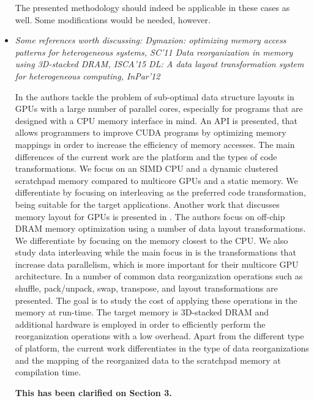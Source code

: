\documentclass[12pt,a4paper,notitlepage]{article}
\begin{document}
\begin{itemize}
The presented methodology should indeed be applicable in these cases as well. Some modifications would be needed, however.

\item \textit{Some references worth discussing:
Dymaxion: optimizing memory access patterns for heterogeneous systems, SC'11
Data reorganization in memory using 3D-stacked DRAM, ISCA'15
DL: A data layout transformation system for heterogeneous computing, InPar'12}

In \cite{dymaxion} the authors tackle the problem of sub-optimal data structure layouts in GPUs with a large number of parallel cores, especially for programs that are designed with a CPU memory interface in mind. 
An API is presented, that allows programmers to improve CUDA programs by optimizing memory mappings in order to increase the efficiency of memory accesses. 
The main differences of the current work are the platform and the types of code transformations. 
We focus on an SIMD CPU and a dynamic clustered scratchpad memory compared to multicore GPUs and a static memory. 
We differentiate by focusing on interleaving as the preferred code transformation, being suitable for the target applications.
Another work that discusses memory layout for GPUs is presented in \cite{DL}.
The authors focus on off-chip DRAM memory optimization using a number of data layout transformations. 
We differentiate by focusing on the memory closest to the CPU. We also study data interleaving while the main focus in \cite{DL} is the transformations that increase data parallelism, which is more important for their multicore GPU architecture.
In \cite{3D} a number of common data reorganization operations such as shuffle, pack/unpack, swap, transpose, and layout transformations are presented. 
The goal is to study the cost of applying these operations in the memory at run-time. The target memory is 3D-stacked DRAM and additional hardware is employed in order to efficiently perform the reorganization operations with a low overhead. 
Apart from the different type of platform, the current work differentiates in the type of data reorganizations and the mapping of the reorganized data to the scratchpad memory at compilation time. 

\textbf{This has been clarified on Section 3.}

\end{itemize}
\end{document}
